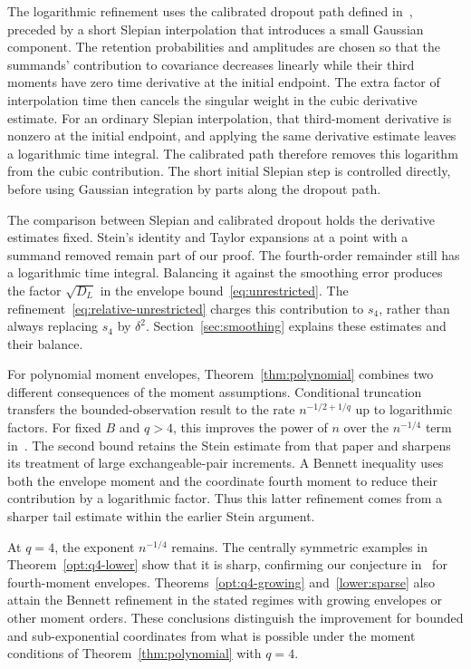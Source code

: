 \documentclass[11pt,letterpaper]{article}
\theoremstyle{remark}
\begin{document}
The logarithmic refinement uses the calibrated dropout path defined
in~\cite[Section~4]{AL}, preceded by a short Slepian interpolation that
introduces a small Gaussian component. The retention probabilities
and amplitudes are chosen so that the summands' contribution to covariance
decreases linearly while their third moments have zero time derivative
at the initial endpoint. The extra factor of interpolation time then cancels the
singular weight in the cubic derivative estimate. For an ordinary
Slepian interpolation, that third-moment derivative is nonzero at the
initial endpoint, and applying the same derivative estimate leaves a
logarithmic time integral. The calibrated path therefore removes this
logarithm from the cubic contribution. The short initial Slepian step
is controlled directly, before using Gaussian integration by parts
along the dropout path.

The comparison between Slepian and calibrated dropout holds the derivative
estimates fixed. Stein's identity and Taylor expansions at a point with
a summand removed remain part of our proof.
The fourth-order remainder still has a logarithmic time integral.
Balancing it against the smoothing error produces the factor
\(\sqrt{D_L}\) in the envelope bound~\eqref{eq:unrestricted}.
The refinement~\eqref{eq:relative-unrestricted} charges this contribution
to \(s_4\), rather than always replacing \(s_4\) by \(\delta^2\).
Section~\ref{sec:smoothing} explains these estimates and their balance.

For polynomial moment envelopes, Theorem~\ref{thm:polynomial} combines
two different consequences of the moment assumptions. Conditional
truncation transfers the bounded-observation result to the rate
\(n^{-1/2+1/q}\) up to logarithmic factors. For fixed \(B\) and
\(q>4\), this improves the power of \(n\) over the \(n^{-1/4}\)
term in~\cite[Theorem~2.5]{CCKK2022}. The second bound retains the
Stein estimate from that paper and sharpens its treatment of large
exchangeable-pair increments. A Bennett
inequality uses both the envelope moment and the coordinate fourth
moment to reduce their contribution by a logarithmic factor.
Thus this latter refinement comes from a sharper tail estimate
within the earlier Stein argument.

At \(q=4\), the exponent \(n^{-1/4}\) remains. The centrally symmetric
examples in Theorem~\ref{opt:q4-lower} show that it is sharp, confirming
our conjecture in~\cite{CCKK2022} for fourth-moment envelopes.
Theorems~\ref{opt:q4-growing} and~\ref{lower:sparse} also attain the
Bennett refinement in the stated regimes with growing envelopes or
other moment orders. These conclusions distinguish the improvement
for bounded and sub-exponential coordinates from what is possible
under the moment conditions of Theorem~\ref{thm:polynomial} with \(q=4\).
\end{document}
